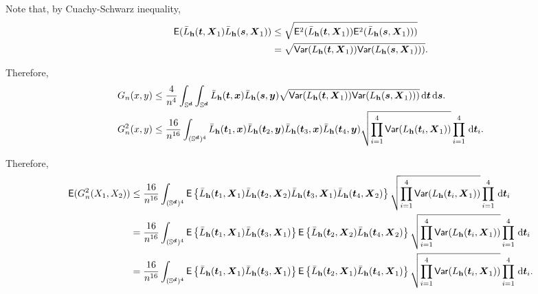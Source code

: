 \documentclass{article}
\begin{document}
Note that, by Cuachy-Schwarz inequality,
\begin{align*}
    \mathsf{E} (\bar{L}_{\bh} (\bt,\bX_1) \bar{L}_{\bh} (\bs,\bX_1)) & \le \sqrt{\mathsf{E}^2 (\bar{L}_{\bh} (\bt,\bX_1)) \mathsf{E}^2 (\bar{L}_{\bh} (\bs,\bX_1)))} \\
    &= \sqrt{\mathsf{Var} ({L}_{\bh} (\bt,\bX_1)) \mathsf{Var} ({L}_{\bh} (\bs,\bX_1)))}.
\end{align*}

Therefore,
\begin{align*}
    G_n(x,y) & \le \frac{4}{n^4} \int_{\Sr} \int_{\Sr} \bar{L}_{\bh} (\bt,\bx) \bar{L}_{\bh} (\bs,\by) \sqrt{\mathsf{Var} ({L}_{\bh} (\bt,\bX_1)) \mathsf{Var} ({L}_{\bh} (\bs,\bX_1)))} \,\rd \bt \,\rd \bs. \\
    G_n^2(x,y) & \le \frac{16}{n^{16}} \int_{(\Sr)^4} \bar{L}_{\bh} (\bt_1,\bx) \bar{L}_{\bh} (\bt_2,\by) \bar{L}_{\bh} (\bt_3,\bx) \bar{L}_{\bh} (\bt_4,\by) \sqrt{\prod_{i=1}^{4} \mathsf{Var} ({L}_{\bh} (\bt_i,\bX_1)) } \prod_{i=1}^{4} \,\rd \bt_i.
\end{align*}

Therefore,
\begin{align*}
    \mathsf{E} (G_n^2(X_1,X_2)) & \le \frac{16}{n^{16}} \int_{(\Sr)^4} \mathsf{E} \lrb{ \bar{L}_{\bh} (\bt_1,\bX_1) \bar{L}_{\bh} (\bt_2,\bX_2) \bar{L}_{\bh} (\bt_3,\bX_1) \bar{L}_{\bh} (\bt_4,\bX_2)} \sqrt{\prod_{i=1}^{4} \mathsf{Var} ({L}_{\bh} (\bt_i,\bX_1)) } \prod_{i=1}^{4} \,\rd \bt_i \\
    &= \frac{16}{n^{16}} \int_{(\Sr)^4} \mathsf{E} \lrb{ \bar{L}_{\bh} (\bt_1,\bX_1) \bar{L}_{\bh} (\bt_3,\bX_1) } \mathsf{E} \lrb{ \bar{L}_{\bh} (\bt_2,\bX_2) \bar{L}_{\bh} (\bt_4,\bX_2)} \sqrt{\prod_{i=1}^{4} \mathsf{Var} ({L}_{\bh} (\bt_i,\bX_1)) } \prod_{i=1}^{4} \,\rd \bt_i \\
    &= \frac{16}{n^{16}} \int_{(\Sr)^4} \mathsf{E} \lrb{ \bar{L}_{\bh} (\bt_1,\bX_1) \bar{L}_{\bh} (\bt_3,\bX_1) } \mathsf{E} \lrb{ \bar{L}_{\bh} (\bt_2,\bX_1) \bar{L}_{\bh} (\bt_4,\bX_1)} \sqrt{\prod_{i=1}^{4} \mathsf{Var} ({L}_{\bh} (\bt_i,\bX_1)) } \prod_{i=1}^{4} \,\rd \bt_i. \\
\end{align*}
\end{document}
